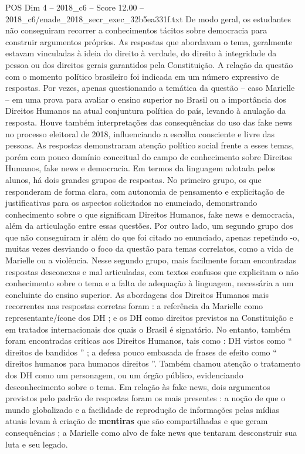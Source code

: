\begin{textsample}{POS Dim 4 – 2018\_c6 – Score 12.00 – 2018\_c6/enade\_2018\_secr\_exec\_32b5ea331f.txt}
De modo geral, os estudantes não conseguiram recorrer a conhecimentos tácitos sobre democracia para construir argumentos próprios.
As respostas que abordavam o tema, geralmente estavam vinculadas à ideia do direito à verdade, do direito à integridade da pessoa ou dos direitos gerais garantidos pela Constituição.
A relação da questão com o momento político brasileiro foi indicada em um número expressivo de respostas.
Por vezes, apenas questionando a temática da questão – caso Marielle – em uma prova para avaliar o ensino superior no Brasil ou a importância dos Direitos Humanos na atual conjuntura política do país, levando à anulação da resposta.
Houve também interpretações das consequências do uso das fake news no processo eleitoral de 2018, influenciando a escolha consciente e livre das pessoas.
As respostas demonstraram atenção político social frente a esses temas, porém com pouco domínio conceitual do campo de conhecimento sobre Direitos Humanos, fake news e democracia.
Em termos da linguagem adotada pelos alunos, há dois grandes grupos de respostas.
No primeiro grupo, os que responderam de forma clara, com autonomia de pensamento e explicitação de justificativas para os aspectos solicitados no enunciado, demonstrando conhecimento sobre o que significam Direitos Humanos, fake news e democracia, além da articulação entre essas questões.
Por outro lado, um segundo grupo dos que não conseguiram ir além do que foi citado no enunciado, apenas repetindo -o, muitas vezes desviando o foco da questão para temas correlatos, como a vida de Marielle ou a violência.
Nesse segundo grupo, mais facilmente foram encontradas respostas desconexas e mal articuladas, com textos confusos que explicitam o não conhecimento sobre o tema e a falta de adequação à linguagem, necessária a um concluinte do ensino superior.
As abordagens dos Direitos Humanos mais recorrentes nas respostas corretas foram : a referência da Marielle como representante/ícone dos DH ; e os DH como direitos previstos na Constituição e em tratados internacionais dos quais o Brasil é signatário.
No entanto, também foram encontradas críticas aos Direitos Humanos, tais como : DH vistos como “ direitos de bandidos ” ; a defesa pouco embasada de frases de efeito como “ direitos humanos para humanos direitos ”.
Também chamou atenção o tratamento dos DH como um personagem, ou um órgão público, evidenciando desconhecimento sobre o tema.
Em relação às fake news, dois argumentos previstos pelo padrão de respostas foram os mais presentes : a noção de que o mundo globalizado e a facilidade de reprodução de informações pelas mídias atuais levam à criação de \textbf{mentiras} que são compartilhadas e que geram consequências ; a Marielle como alvo de fake news que tentaram desconstruir sua luta e seu legado.

\end{textsample}
